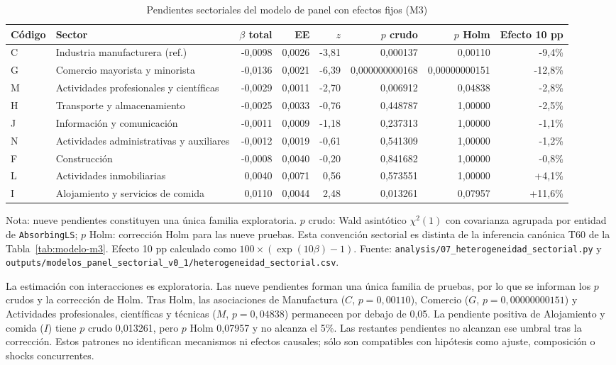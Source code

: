 \documentclass[12pt,a4paper]{article}
\begin{document}
\begin{table}[H]
\centering
\caption{Pendientes sectoriales del modelo de panel con efectos fijos (M3)}
\label{tab:heterogeneidad-sectorial}
\small
\begin{tabularx}{\textwidth}{lXrrrrrr}
\toprule
\textbf{Código} & \textbf{Sector} & \textbf{$\beta$ total} & \textbf{EE} & \textbf{$z$} & \textbf{$p$ crudo} & \textbf{$p$ Holm} & \textbf{Efecto 10 pp} \\
\midrule
C & Industria manufacturera (ref.) & -0,0098 & 0,0026 & -3,81 & 0,000137 & 0,00110 & -9,4\% \\
G & Comercio mayorista y minorista & -0,0136 & 0,0021 & -6,39 & 0,000000000168 & 0,00000000151 & -12,8\% \\
M & Actividades profesionales y científicas & -0,0029 & 0,0011 & -2,70 & 0,006912 & 0,04838 & -2,8\% \\
H & Transporte y almacenamiento & -0,0025 & 0,0033 & -0,76 & 0,448787 & 1,00000 & -2,5\% \\
J & Información y comunicación & -0,0011 & 0,0009 & -1,18 & 0,237313 & 1,00000 & -1,1\% \\
N & Actividades administrativas y auxiliares & -0,0012 & 0,0019 & -0,61 & 0,541309 & 1,00000 & -1,2\% \\
F & Construcción & -0,0008 & 0,0040 & -0,20 & 0,841682 & 1,00000 & -0,8\% \\
L & Actividades inmobiliarias & 0,0040 & 0,0071 & 0,56 & 0,573551 & 1,00000 & +4,1\% \\
I & Alojamiento y servicios de comida & 0,0110 & 0,0044 & 2,48 & 0,013261 & 0,07957 & +11,6\% \\
\bottomrule
\end{tabularx}
\begin{flushleft}
\footnotesize Nota: nueve pendientes constituyen una única familia exploratoria. $p$ crudo: Wald asintótico $\chi^2(1)$ con covarianza agrupada por entidad de \texttt{AbsorbingLS}; $p$ Holm: corrección Holm para las nueve pruebas. Esta convención sectorial es distinta de la inferencia canónica T60 de la Tabla~\ref{tab:modelo-m3}. Efecto 10 pp calculado como $100\times(\exp(10\beta)-1)$. Fuente: \texttt{analysis/07\_heterogeneidad\_sectorial.py} y \texttt{outputs/modelos\_panel\_sectorial\_v0\_1/heterogeneidad\_sectorial.csv}.
\end{flushleft}
\end{table}

La estimación con interacciones es exploratoria. Las nueve pendientes forman una única familia de pruebas, por lo que se informan los $p$ crudos y la corrección de Holm. Tras Holm, las asociaciones de Manufactura ($C$, $p=0,00110$), Comercio ($G$, $p=0,00000000151$) y Actividades profesionales, científicas y técnicas ($M$, $p=0,04838$) permanecen por debajo de 0,05. La pendiente positiva de Alojamiento y comida ($I$) tiene $p$ crudo 0,013261, pero $p$ Holm 0,07957 y no alcanza el 5\%. Las restantes pendientes no alcanzan ese umbral tras la corrección. Estos patrones no identifican mecanismos ni efectos causales; sólo son compatibles con hipótesis como ajuste, composición o shocks concurrentes.
\end{document}
